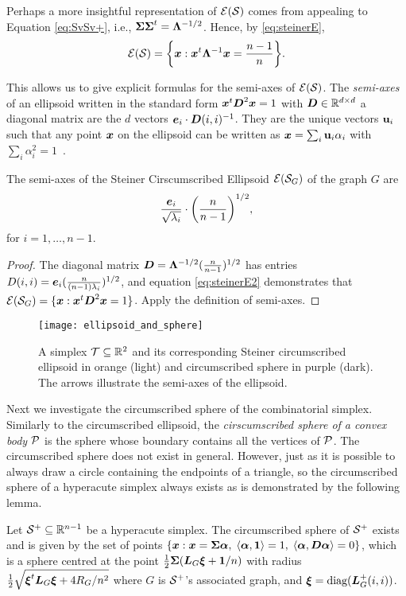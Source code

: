  Perhaps a more insightful representation of $\El(\splx)$ comes from appealing to Equation \eqref{eq:SvSv+}, i.e., $\Sv\Sv^\tp = \Eval^{-1/2}$. Hence, by \eqref{eq:steinerE},
\begin{equation}
\label{eq:steinerE2}
    \El(\splx) = \bigg\{\x:\x^\tp \Eval^{-1}\x = \frac{n-1}{n}\bigg\}.
\end{equation}

This allows us to give explicit formulas for the semi-axes of $\El(\splx)$.
 The \emph{semi-axes} of an ellipsoid written in the standard form $\x^\tp \D^2\x=1$ with $\D\in\R^{d\times d}$ a diagonal matrix are the $d$ vectors $\e_i\cdot \D(i,i)^{-1}$. They are the unique vectors $\u_i$ such that any  point $\x$ on the ellipsoid can be written as $\x=\sum_i \u_i\alpha_i$ with  $\sum_i\alpha_i^2=1$~\cite{devriendt2018simplex}. 
 
 \begin{lemma}
 	The semi-axes of the Steiner Cirscumscribed Ellipsoid  $\El(\splx_G)$ of  the graph $G$ are 
 	\[\frac{\e_i}{\sqrt{\lambda_i} }\cdot \bigg(\frac{n}{n-1}\bigg)^{1/2}, \]
 	for $i=1,\dots,n-1$. 
 \end{lemma}
\begin{proof}
	The diagonal matrix $\D=\Eval^{-1/2} (\frac{n}{n-1})^{1/2}$ has entries $D(i,i) = \e_i(\frac{n}{(n-1)\lambda_i})^{1/2}$, and equation  \eqref{eq:steinerE2} demonstrates  that  $\El(\splx_G) = \{\x:\x^\tp \D^2\x=1\}$. Apply the definition of semi-axes. 
\end{proof}

\begin{figure}
	\centering
	\texttt{[image: ellipsoid\_and\_sphere]}
	\caption{A simplex $\ssplx\subset\R^2$ and  its corresponding Steiner circumscribed ellipsoid in orange (light) and circumscribed sphere in purple (dark). The arrows illustrate the semi-axes of the ellipsoid.}
	\label{fig:ellipsoid_and_sphere}
\end{figure}

Next we investigate the circumscribed sphere of the combinatorial  simplex. Similarly to the circumscribed ellipsoid, the \emph{cirscumscribed sphere  of a convex body $\P$} is the sphere whose boundary contains all the vertices of $\P$. The circumscribed sphere does not exist in general. However, just as it is possible to always draw a circle containing the endpoints  of a triangle, so the circumscribed sphere of a hyperacute simplex always exists  as is demonstrated  by the following lemma.  

\begin{lemma}
	\label{lem:circ_sphere}
	Let $\splx^+\subset\R^{n-1}$ be a hyperacute simplex. The circumscribed sphere  of $\splx^+$ exists and is given by the set of points $\{\x:\x=\Sv\balpha, \; \la \balpha,\one \ra = 1, \; \la \balpha,\D\balpha\ra =0\}$, which is a sphere centred at the point $\frac{1}{2}\Sv(\L_G\bxi + \one/n)$ with radius $\frac{1}{2}\sqrt{\bxi^\tp\L_G\bxi + 4R_G/n^2}$ where $G$ is $\splx^+$'s associated graph, and $\bxi = \diag(\L_G^+(i,i))$. 
\end{lemma}


